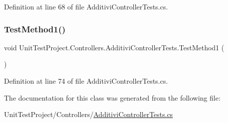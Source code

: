 Definition at line 68 of file Additivi\+Controller\+Tests.\+cs.

\mbox{\label{class_unit_test_project_1_1_controllers_1_1_additivi_controller_tests_abd3f43d055236003db155c91b86f92bd}} 
\subsubsection{\texorpdfstring{Test\+Method1()}{TestMethod1()}}
{\footnotesize\ttfamily void Unit\+Test\+Project.\+Controllers.\+Additivi\+Controller\+Tests.\+Test\+Method1 (\begin{DoxyParamCaption}{ }\end{DoxyParamCaption})}



Definition at line 74 of file Additivi\+Controller\+Tests.\+cs.



The documentation for this class was generated from the following file\+:\begin{DoxyCompactItemize}
\item 
Unit\+Test\+Project/\+Controllers/\mbox{\hyperlink{_additivi_controller_tests_8cs}{Additivi\+Controller\+Tests.\+cs}}\end{DoxyCompactItemize}
